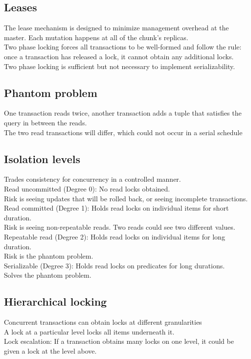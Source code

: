 \subsection{Leases}
The lease mechanism is designed to minimize management overhead at the master.
Each mutation happens at all of the chunk's replicas. \\
Two phase locking forces all transactions to be well-formed and follow the rule: once a transaction has released a lock, it cannot obtain any additional locks.\\
Two phase locking is sufficient but not necessary to implement serializability.
\subsection{Phantom problem}
One transaction reads twice, another transaction adds a tuple that satisfies the query in between the reads. \\
The two read transactions will differ, which could not occur in a serial schedule
\subsection{Isolation levels}
Trades consistency for concurrency in a controlled manner.\\
Read uncommitted (Degree 0): No read locks obtained. \\
Risk is seeing updates that will be rolled back, or seeing incomplete transactions.\\
Read committed (Degree 1): Holds read locks on individual items for short duration. \\
Risk is seeing non-repeatable reads. Two reads could see two different values. \\
Repeatable read (Degree 2): Holds read locks on individual items for long duration. \\
Risk is the phantom problem.\\
Serializable (Degree 3): Holds read locks on predicates for long durations.\\
Solves the phantom problem.
\subsection{Hierarchical locking}
Concurrent transactions can obtain locks at different granularities\\
A lock at a particular level locks all items underneath it.\\
Lock escalation: If a transaction obtains many locks on one level, it could be given a lock at the level above.\\
\\
\\
\\
\\
